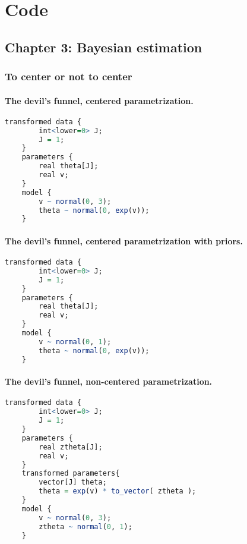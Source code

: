 \chapter{Code}


\section{Chapter 3: Bayesian estimation} \label{app:chapter3}

\subsection{To center or not to center} \label{app:noncenter}

\subsubsection{The devil's funnel, centered parametrization.} 
\begin{lstlisting}[language=R]
	transformed data {
		int<lower=0> J;
		J = 1;
	}
	parameters {
		real theta[J];
		real v;
	}
	model {
		v ~ normal(0, 3);
		theta ~ normal(0, exp(v));
	}
\end{lstlisting}


\subsubsection{The devil's funnel, centered parametrization with priors.} 
\begin{lstlisting}[language=R]
	transformed data {
		int<lower=0> J;
		J = 1;
	}
	parameters {
		real theta[J];
		real v;
	}
	model {
		v ~ normal(0, 1);
		theta ~ normal(0, exp(v));
	}
\end{lstlisting}


\subsubsection{The devil's funnel, non-centered parametrization.} 
\begin{lstlisting}[language=R]
	transformed data {
		int<lower=0> J;
		J = 1;
	}
	parameters {
		real ztheta[J];
		real v;
	}
	transformed parameters{
		vector[J] theta;
		theta = exp(v) * to_vector( ztheta );
	}
	model {
		v ~ normal(0, 3);
		ztheta ~ normal(0, 1);
	}
\end{lstlisting}

